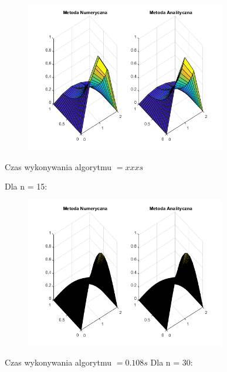 \begin{figure}[!ht]
	\begin{center}
		\includegraphics[width=0.78\textwidth]{Lab7/charts/df/5.png}
	\end{center}
\end{figure}


Czas wykonywania algorytmu $ = xxx s$


Dla n = 15:

\begin{figure}[!ht]
	\begin{center}
		\includegraphics[width=0.78\textwidth]{Lab7/charts/df/15.png}
	\end{center}
\end{figure}


Czas wykonywania algorytmu $ = 0.108 s$
\newpage
Dla n = 30:


